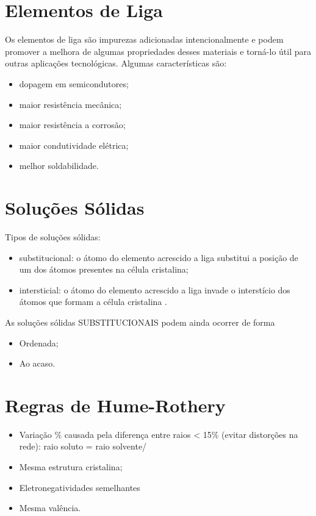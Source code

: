 \section{Elementos de Liga}

Os elementos de liga são impurezas adicionadas intencionalmente e podem promover a melhora de algumas propriedades desses materiais e torná-lo útil para outras aplicações tecnológicas. Algumas características são:

\begin{itemize}
	\item dopagem em semicondutores;
	\item maior resistência mecânica;
	\item maior resistência a corrosão;
	\item maior condutividade elétrica;
	\item melhor soldabilidade.
\end{itemize}


\section{Soluções Sólidas}

Tipos de soluções sólidas:

\begin{itemize}
	\item substitucional: o átomo do elemento acrescido a liga substitui a posição de um dos átomos presentes na célula cristalina;
	\item intersticial: o átomo do elemento acrescido a liga invade o interstício dos átomos que formam a célula cristalina .
\end{itemize}


As soluções sólidas SUBSTITUCIONAIS podem ainda ocorrer de forma 

\begin{itemize}
	\item Ordenada;
	\item Ao acaso.
\end{itemize}

\section{Regras de Hume-Rothery}

\begin{itemize}
	\item Variação \% causada pela diferença entre raios < 15\% (evitar distorções na rede): raio soluto = raio solvente/
	\item Mesma estrutura cristalina;
	\item Eletronegatividades semelhantes
	\item Mesma valência.
\end{itemize}



